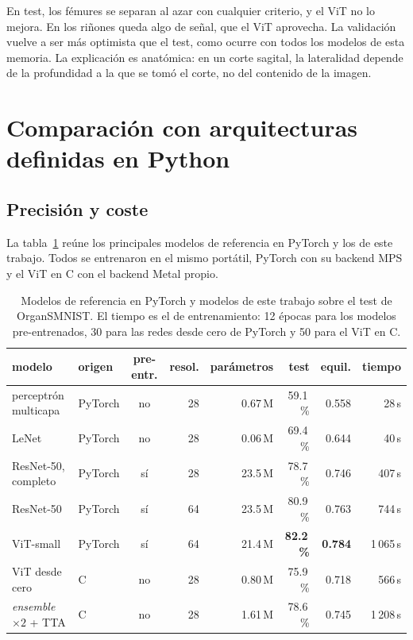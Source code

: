 \documentclass[11pt,a4paper]{article}
\begin{document}
En test, los fémures se separan al azar con cualquier criterio, y el ViT no lo
mejora. En los riñones queda algo de señal, que el ViT aprovecha. La
validación vuelve a ser más optimista que el test, como ocurre con todos los
modelos de esta memoria. La explicación es anatómica: en un corte sagital, la
lateralidad depende de la profundidad a la que se tomó el corte, no del
contenido de la imagen.

\section{Comparación con arquitecturas definidas en Python}

\subsection{Precisión y coste}

La tabla~\ref{tab:comparacion} reúne los principales modelos de referencia en
PyTorch y los de este trabajo. Todos se entrenaron en el mismo portátil,
PyTorch con su backend MPS y el ViT en C con el backend Metal propio.

\begin{table}[H]
  \centering\small
  \setlength{\tabcolsep}{4pt}
  \begin{tabular}{llcrrrrr}
    \toprule
    modelo & origen & pre-entr. & resol. & parámetros & test & equil. & tiempo \\
    \midrule
    perceptrón multicapa & PyTorch & no & 28 & 0.67\,M & 59.1\,\% & 0.558 & 28\,s \\
    LeNet                & PyTorch & no & 28 & 0.06\,M & 69.4\,\% & 0.644 & 40\,s \\
    ResNet-50, completo  & PyTorch & sí & 28 & 23.5\,M & 78.7\,\% & 0.746 & 407\,s \\
    ResNet-50            & PyTorch & sí & 64 & 23.5\,M & 80.9\,\% & 0.763 & 744\,s \\
    ViT-small            & PyTorch & sí & 64 & 21.4\,M & \textbf{82.2\,\%} & \textbf{0.784} & 1\,065\,s \\
    \midrule
    ViT desde cero       & C       & no & 28 & 0.80\,M & 75.9\,\% & 0.718 & 566\,s \\
    \emph{ensemble} $\times 2$ + TTA & C   & no & 28 & 1.61\,M & 78.6\,\% & 0.745 & 1\,208\,s \\
    \bottomrule
  \end{tabular}
  \caption{Modelos de referencia en PyTorch y modelos de este trabajo sobre el
           test de OrganSMNIST. El tiempo es el de entrenamiento: 12 épocas para los
           modelos pre-entrenados, 30 para las redes desde cero de PyTorch y 50
           para el ViT en C.}
  \label{tab:comparacion}
\end{table}
\end{document}
